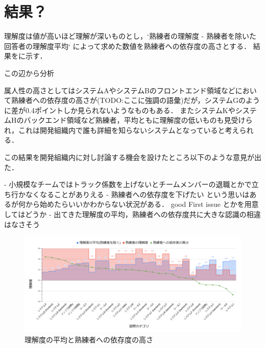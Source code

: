 \section{結果？}

理解度は値が高いほど理解が深いものとし，`熟練者の理解度 - 熟練者を除いた回答者の理解度平均` によって求めた数値を熟練者への依存度の高さとする．
結果をに示す．

この辺から分析




属人性の高さとしてはシステムAやシステムBのフロントエンド領域などにおいて熟練者への依存度の高さが(TODO:ここに強調の語彙)だが，システムGのように差が0.4ポイントしか見られないようなものもある．
またシステムKやシステムHのバックエンド領域など熟練者，平均ともに理解度の低いものも見受けられ，これは開発組織内で誰も詳細を知らないシステムとなっていると考えられる．

この結果を開発組織内に対し討論する機会を設けたところ以下のような意見が出た．

- 小規模なチームではトラック係数を上げないとチームメンバーの退職とかで立ち行かなくなることがありえる
- 熟練者への依存度を下げたい という思いはあるが何から始めたらいいかわからない状況がある． good First issue とかを用意してはどうか
- 出てきた理解度の平均，熟練者への依存度共に大きな認識の相違はなさそう


\begin{figure}
	\centering
	\includegraphics[keepaspectratio,width=0.9\linewidth]{img/rikai.png}
	\caption{理解度の平均と熟練者への依存度の高さ}
	\label{img:rikai}
\end{figure}
